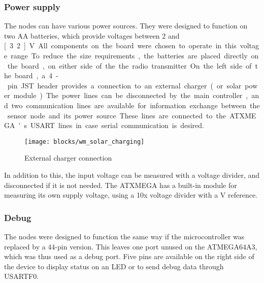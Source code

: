 \subsubsection{Power supply}

The nodes can have various power sources. They were designed to function on two
AA batteries, which provide voltages between 2 and \unit[3.2]{V}. All components on
the board were chosen to operate in this voltage range.

To reduce the size requirements, the batteries are placed directly on the board,
on either side of the the radio transmitter.

On the left side of the board, a 4-pin JST header provides a connection to an
external charger (or solar power module). The power lines can be disconnected by
the main controller, and two communication lines are available for information
exchange between the sensor node and its power source. These lines are connected
to the ATXMEGA's USART lines in case serial communication is desired.

\begin{figure}[h]
  \begin{center}
    \texttt{[image: blocks/wm\_solar\_charging]}
  \end{center}
  \caption{External charger connection}
  \label{fig:solar-charger}
\end{figure}

In addition to this, the input voltage can be measured with a voltage divider,
and disconnected if it is not needed. The ATXMEGA has a built-in module for
measuring its own supply voltage, using a 10x voltage divider with a \unit[1]{V}
reference.

\subsubsection{Debug}

The nodes were designed to function the same way if the microcontroller was
replaced by a 44-pin version. This leaves one port unused on the ATMEGA64A3,
which was thus used as a debug port. Five pins are available on the right side
of the device to display status on an LED or to send debug data through USARTF0.

